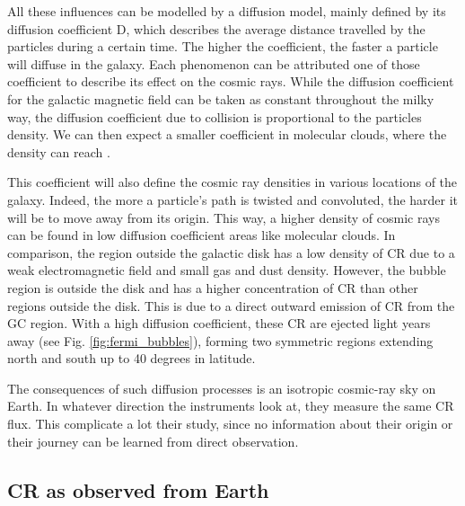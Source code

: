All these influences can be modelled by a diffusion model, mainly defined by its diffusion coefficient D, which describes the average distance travelled by the particles during a certain time. The higher the coefficient, the faster a particle will diffuse in the galaxy. Each phenomenon can be attributed one of those coefficient to describe its effect on the cosmic rays. 
While the diffusion coefficient for the galactic magnetic field can be taken as constant throughout the milky way, the diffusion coefficient due to collision is proportional to the particles density. We can then expect a smaller coefficient in molecular clouds, where the density can reach .

This coefficient will also define the cosmic ray densities in various locations of the galaxy. Indeed, the more a particle's path is twisted and convoluted, the harder it will be to move away from its origin. This way, a higher density of cosmic rays can be found in low diffusion coefficient areas like molecular clouds. In comparison, the region outside the galactic disk has a low density of CR due to a weak electromagnetic field and small gas and dust density. However, the bubble region is outside the disk and has a higher concentration of CR than other regions outside the disk. This is due to a direct outward emission of CR from the GC region. With a high diffusion coefficient, these CR are ejected light years away (see Fig. \ref{fig:fermi_bubbles}), forming two symmetric regions extending north and south up to 40 degrees in latitude.

The consequences of such diffusion processes is an isotropic cosmic-ray sky on Earth. In whatever direction the instruments look at, they measure the same CR flux. This complicate a lot their study, since no information about their origin or their journey can be learned from direct observation. 

\subsection{CR as observed from Earth}

